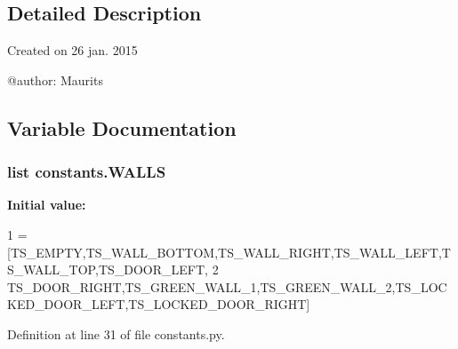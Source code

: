 \subsection{Detailed Description}
\begin{DoxyVerb}Created on 26 jan. 2015

@author: Maurits
\end{DoxyVerb}
 

\subsection{Variable Documentation}
\hypertarget{namespaceconstants_ab7975d0e5ba674989e909d1881c6f7ae}{}
\subsubsection[{W\+A\+L\+L\+S}]{\setlength{\rightskip}{0pt plus 5cm}list constants.\+W\+A\+L\+L\+S}\label{namespaceconstants_ab7975d0e5ba674989e909d1881c6f7ae}
{\bfseries Initial value\+:}
\begin{DoxyCode}
1 = [TS\_EMPTY,TS\_WALL\_BOTTOM,TS\_WALL\_RIGHT,TS\_WALL\_LEFT,TS\_WALL\_TOP,TS\_DOOR\_LEFT,
2        TS\_DOOR\_RIGHT,TS\_GREEN\_WALL\_1,TS\_GREEN\_WALL\_2,TS\_LOCKED\_DOOR\_LEFT,TS\_LOCKED\_DOOR\_RIGHT]
\end{DoxyCode}


Definition at line 31 of file constants.\+py.

